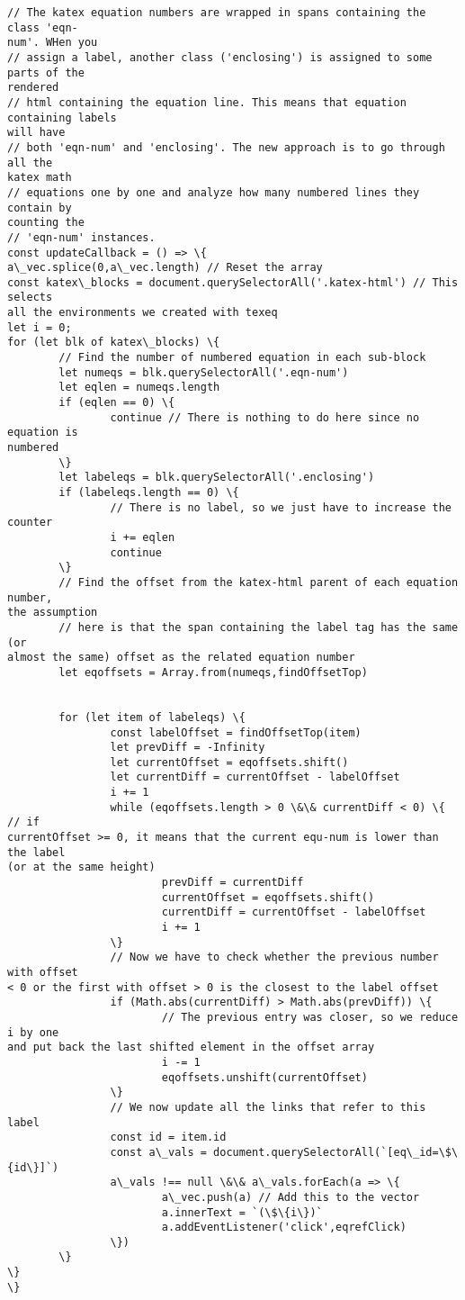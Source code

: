 \documentclass[11pt]{article}
\begin{document}
\begin{tcolorbox}[breakable, size=fbox, boxrule=.5pt, pad at break*=1mm, opacityfill=0]
\begin{Verbatim}[commandchars=\\\{\}]
// The katex equation numbers are wrapped in spans containing the class 'eqn-
num'. WHen you
// assign a label, another class ('enclosing') is assigned to some parts of the
rendered
// html containing the equation line. This means that equation containing labels
will have
// both 'eqn-num' and 'enclosing'. The new approach is to go through all the
katex math
// equations one by one and analyze how many numbered lines they contain by
counting the
// 'eqn-num' instances.
const updateCallback = () => \{
a\_vec.splice(0,a\_vec.length) // Reset the array
const katex\_blocks = document.querySelectorAll('.katex-html') // This selects
all the environments we created with texeq
let i = 0;
for (let blk of katex\_blocks) \{
        // Find the number of numbered equation in each sub-block
        let numeqs = blk.querySelectorAll('.eqn-num')
        let eqlen = numeqs.length
        if (eqlen == 0) \{
                continue // There is nothing to do here since no equation is
numbered
        \}
        let labeleqs = blk.querySelectorAll('.enclosing')
        if (labeleqs.length == 0) \{
                // There is no label, so we just have to increase the counter
                i += eqlen
                continue
        \}
        // Find the offset from the katex-html parent of each equation number,
the assumption
        // here is that the span containing the label tag has the same (or
almost the same) offset as the related equation number
        let eqoffsets = Array.from(numeqs,findOffsetTop)


        for (let item of labeleqs) \{
                const labelOffset = findOffsetTop(item)
                let prevDiff = -Infinity
                let currentOffset = eqoffsets.shift()
                let currentDiff = currentOffset - labelOffset
                i += 1
                while (eqoffsets.length > 0 \&\& currentDiff < 0) \{ // if
currentOffset >= 0, it means that the current equ-num is lower than the label
(or at the same height)
                        prevDiff = currentDiff
                        currentOffset = eqoffsets.shift()
                        currentDiff = currentOffset - labelOffset
                        i += 1
                \}
                // Now we have to check whether the previous number with offset
< 0 or the first with offset > 0 is the closest to the label offset
                if (Math.abs(currentDiff) > Math.abs(prevDiff)) \{
                        // The previous entry was closer, so we reduce i by one
and put back the last shifted element in the offset array
                        i -= 1
                        eqoffsets.unshift(currentOffset)
                \}
                // We now update all the links that refer to this label
                const id = item.id
                const a\_vals = document.querySelectorAll(`[eq\_id=\$\{id\}]`)
                a\_vals !== null \&\& a\_vals.forEach(a => \{
                        a\_vec.push(a) // Add this to the vector
                        a.innerText = `(\$\{i\})`
                        a.addEventListener('click',eqrefClick)
                \})
        \}
\}
\}


\end{Verbatim}
\end{tcolorbox}
\end{document}
